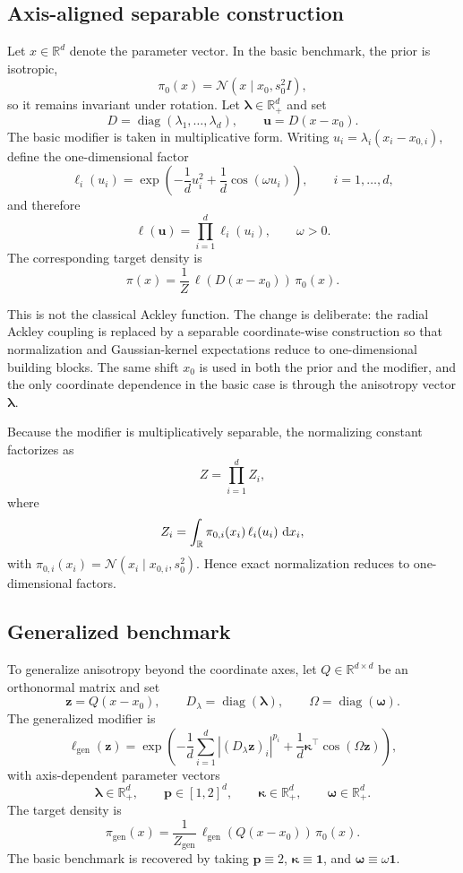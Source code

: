\documentclass[11pt,a4paper]{article}
\def\d{\,{\rm d}}
\def\Real{\mathbb R}
\newcommand{\symbfit}[1]{\bm{#1}}
\newcommand{\vc}[1]{{\symbfit{#1}}}
\DeclareMathOperator{\diag}{diag}
\begin{document}
\subsection{Axis-aligned separable construction}
Let $x \in \Real^d$ denote the parameter vector. In the basic benchmark, the prior is isotropic,
\[
\pi_0(x) = \mathcal{N}(x \mid x_0,s_0^2 I),
\]
so it remains invariant under rotation. Let $\vc\lambda \in \Real_+^d$ and set
\[
D = \diag(\lambda_1,\dots,\lambda_d),
\qquad
\vc u = D(x-x_0).
\]
The basic modifier is taken in multiplicative form. Writing $u_i = \lambda_i (x_i-x_{0,i})$, define the one-dimensional factor
\[
\ell_i(u_i)
=
\exp\!\left(
-\frac{1}{d}u_i^2 + \frac{1}{d}\cos(\omega u_i)
\right),
\qquad i=1,\dots,d,
\]
and therefore
\[
\ell(\vc u) = \prod_{i=1}^d \ell_i(u_i),
\qquad \omega > 0.
\]
The corresponding target density is
\begin{equation}
\label{eq:target-density-axis}
\pi(x)
=
\frac{1}{Z}\,\ell(D(x-x_0))\,\pi_0(x).
\end{equation}

This is not the classical Ackley function. The change is deliberate: the radial Ackley coupling is replaced by a separable coordinate-wise construction so that normalization and Gaussian-kernel expectations reduce to one-dimensional building blocks. The same shift $x_0$ is used in both the prior and the modifier, and the only coordinate dependence in the basic case is through the anisotropy vector $\vc\lambda$.

Because the modifier is multiplicatively separable, the normalizing constant factorizes as
\[
Z = \prod_{i=1}^d Z_i,
\]
where
\[
Z_i
=
\int_{\Real}
\pi_{0,i}(x_i)\,\ell_i(u_i)\,\d x_i,
\]
with $\pi_{0,i}(x_i)=\mathcal{N}(x_i \mid x_{0,i},s_0^2)$. Hence exact normalization reduces to one-dimensional factors.

\subsection{Generalized benchmark}
To generalize anisotropy beyond the coordinate axes, let $Q \in \Real^{d \times d}$ be an orthonormal matrix and set
\[
\vc z = Q(x-x_0),
\qquad
D_{\lambda} = \diag(\vc\lambda),
\qquad
\Omega = \diag(\vc\omega).
\]
The generalized modifier is
\[
\ell_{\mathrm{gen}}(\vc z)
=
\exp\!\left(
-\frac{1}{d}\sum_{i=1}^d |(D_{\lambda}\vc z)_i|^{p_i}
+ \frac{1}{d}\vc\kappa^\top \cos(\Omega \vc z)
\right),
\]
with axis-dependent parameter vectors
\[
\vc\lambda \in \Real_+^d,
\qquad
\vc p \in [1,2]^d,
\qquad
\vc\kappa \in \Real_+^d,
\qquad
\vc\omega \in \Real_+^d.
\]
The target density is
\[
\pi_{\mathrm{gen}}(x)
=
\frac{1}{Z_{\mathrm{gen}}}\,\ell_{\mathrm{gen}}(Q(x-x_0))\,\pi_0(x).
\]
The basic benchmark is recovered by taking $\vc p \equiv 2$, $\vc\kappa \equiv \vc 1$, and $\vc\omega \equiv \omega \vc 1$.
\end{document}
